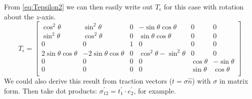 \documentclass{article}
\begin{document}
From \cref{eq:Tepsilon2} we can then easily write out $T_\epsilon$ for this case with rotation about the $z$-axis.
\begin{equation}
    T_\epsilon =
\begin{bmatrix}
\cos^2\theta & \sin^2\theta & 0 &  -\sin\theta\cos\theta & 0 & 0 \\
\sin^2\theta & \cos^2\theta & 0 & \sin\theta\cos\theta &  0  & 0  \\
 0 &  0  &  1  & 0  &  0   &   0   \\
2\sin\theta\cos\theta & -2\sin\theta\cos\theta & 0  & \cos^2\theta - \sin^2\theta &  0  & 0 \\
 0  & 0  & 0 &  0   & \cos\theta  & -\sin\theta  \\
 0  & 0  &  0   & 0 & \sin\theta  & \cos\theta \\
\end{bmatrix}
\label{eq:rotatezeps}
\end{equation}
We could also derive this result from traction vectors ($t = \sigma \hat{n}$) with $\sigma$ in matrix form. Then take dot products: $\sigma_{12}^\prime = t_1^\prime \cdot e_2^\prime$, for example.





\end{document}
